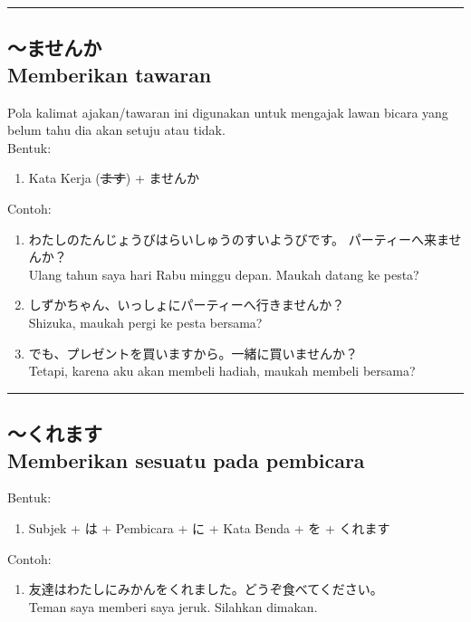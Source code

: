 \vspace{0.2cm}\hrule height 1pt\vspace{0.2cm}

\newpage
\subsection*{
    ～ませんか \\
    Memberikan tawaran
}
Pola kalimat ajakan/tawaran ini digunakan untuk mengajak 
lawan bicara yang belum tahu dia akan setuju atau tidak.\\
Bentuk:
\begin{enumerate}
    \item Kata Kerja (\sout{ます}) + ませんか
\end{enumerate}
Contoh: 
\begin{enumerate}
    \item わたしのたんじょうびはらいしゅうのすいようびです。
    パーティーへ来ませんか？
    \\ Ulang tahun saya hari Rabu minggu depan. 
    Maukah datang ke pesta?
    \item しずかちゃん、いっしょにパーティーへ行きませんか？
    \\ Shizuka, maukah pergi ke pesta bersama?
    \item でも、プレゼントを買いますから。一緒に買いませんか？
    \\ Tetapi, karena aku akan membeli hadiah, maukah membeli bersama?
\end{enumerate}

\vspace{0.2cm}\hrule height 1pt\vspace{0.2cm}


\subsection*{
    ～くれます \\
    Memberikan sesuatu pada pembicara
}
Bentuk:
\begin{enumerate}
    \item Subjek + は + Pembicara + に + Kata Benda + を + くれます
\end{enumerate}
Contoh: 
\begin{enumerate}
    \item 友達はわたしにみかんをくれました。どうぞ食べてください。
    \\ Teman saya memberi saya jeruk. Silahkan dimakan.
\end{enumerate}

